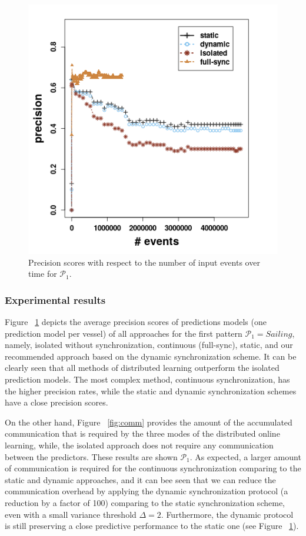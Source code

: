 \begin{figure}[h]
	
	\includegraphics[width=.5\textwidth]{figures/precision_p1.png}
	
	\caption{Precision scores with respect to the number of input events over time for $\mathcal{P}_1$.}
	\label{fig:precsions}
\end{figure}

\subsubsection*{Experimental results} Figure ~\ref{fig:precsions} depicts the average precision scores of predictions models (one prediction model per vessel) of all approaches for the first pattern $\mathcal{P}_1=Sailing$, namely, isolated without synchronization, continuous (full-sync), static, and our recommended approach based on the dynamic synchronization scheme. It can be clearly seen that all methods of distributed learning outperform the isolated prediction models. The most complex method, continuous synchronization, has the higher precision rates, while the static and dynamic synchronization schemes have a close precision scores.
 


 
 
\par On the other hand, Figure ~\ref{fig:comm} provides the amount of the accumulated communication that is required by the three modes of the distributed online learning, while, the isolated approach does not require any communication between the predictors. These results are shown  $\mathcal{P}_1$.  As expected, a larger amount of communication is required for the continuous synchronization comparing to the static and dynamic approaches, and it can bee seen that we can reduce the communication overhead by applying the dynamic synchronization protocol (a reduction by a factor of 100) comparing to the static synchronization scheme, even with a small variance threshold $\Delta=2$. Furthermore,  the dynamic  protocol is still preserving a close predictive performance to the static one (see Figure ~\ref{fig:precsions}).    

